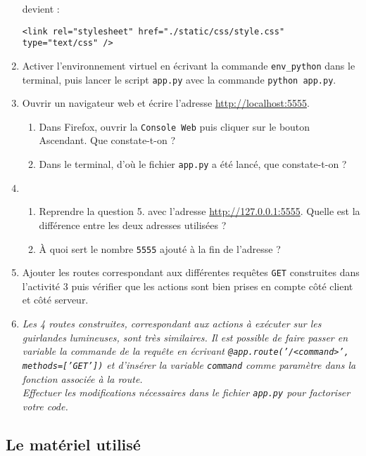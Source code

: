 \documentclass[a4paper]{article}
\begin{document}
\begin{enumerate}
    devient :

	\begin{verbatim}
<link rel="stylesheet" href="./static/css/style.css" type="text/css" />
    \end{verbatim}
  \item Activer l'environnement virtuel en écrivant la commande \verb|env_python| dans le terminal, puis lancer le script \verb|app.py| avec la commande \verb|python app.py|.
  \item Ouvrir un navigateur web et écrire l'adresse \url{http://localhost:5555}.
    \begin{enumerate}
      \item Dans Firefox, ouvrir la \verb|Console Web| puis cliquer sur le bouton \og{}Ascendant\fg. Que constate-t-on ?
      \item Dans le terminal, d'où le fichier \verb|app.py| a été lancé, que constate-t-on ?
    \end{enumerate}
  \item

    \begin{enumerate}
      \item Reprendre la question 5. avec l'adresse \url{http://127.0.0.1:5555}.  Quelle est la différence entre les deux adresses utilisées ?
      \item À quoi sert le nombre \verb|5555| ajouté à la fin de l'adresse ?
    \end{enumerate}
  \item Ajouter les routes correspondant aux différentes requêtes \verb|GET| construites dans l'activité 3 puis vérifier que les actions sont bien prises en compte côté client et côté serveur.
  \item {\itshape Les 4 routes construites, correspondant aux actions à exécuter sur les guirlandes lumineuses, sont très similaires. Il est possible de faire passer en variable la commande de la requête en écrivant \texttt{@app.route('/<command>', methods=['GET'])} et d'insérer la variable \texttt{command} comme paramètre dans la fonction associée à la route.\\ Effectuer les modifications nécessaires dans le fichier \verb|app.py| pour \og factoriser \fg{} votre code.}
\end{enumerate}

\pagebreak

\subsection{Le matériel utilisé}
\end{document}
